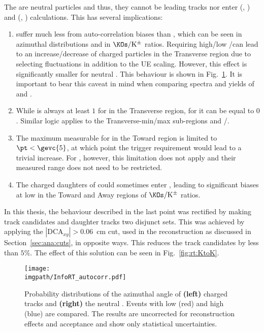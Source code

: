 The \VOs are neutral particles and thus, they cannot be leading tracks nor enter \NT (\NTmin, \NTmax) and \RT (\RTmin, \RTmax) calculations. This has several implications:
\begin{enumerate}
\item \VOs suffer much less from auto-correlation biases than \pikp, which can be seen in azimuthal distributions and in $\KOs / \mathrm{K}^\pm$ ratios. Requiring high/low \NT/\RT can lead to an increase/decrease of charged particles in the Transverse region due to selecting fluctuations in addition to the UE scaling. However, this effect is significantly smaller for neutral \VOs. This behaviour is shown in Fig.~\ref{fig:rt:autocorr}. It is important to bear this caveat in mind when comparing \pt spectra and yields of \pikp and \VOs.
\item While \NT is always at least $1$ for \pikp in the Transverse region, for \VOs it can be equal to $0$. Similar logic applies to the Transverse-min/max sub-regions and \NTmin/\NTmax .
\item The maximum \pt measurable for \pikp in the Toward region is limited to $\pt < \gevc{5}$, at which point the trigger requirement would lead to a trivial increase. For \VOs, however, this limitation does not apply and their measured \pt range does not need to be restricted.
\item The charged daughters of \VOs could sometimes enter \NT, leading to significant biases at low \pt in the Toward and Away regions of $\KOs/\mathrm{K}^\pm$ ratios. 
\end{enumerate} 

In this thesis, the behaviour described in the last point was rectified by making \NT track candidates and \VO daughter tracks two disjunct sets. This was achieved by applying the $|\mathrm{DCA}_{xy}|>0.06$~cm cut, used in the \VO reconstruction as discussed in Section~\ref{sec:ana:cuts}, in opposite ways. This reduces the \NT track candidates by less than $5\%$. The effect of this solution can be seen in Fig.~\ref{fig:rt:KtoK}.

\begin{figure}%
\texttt{[image: \\imgpath/InfoRT\_autocorr.pdf]}\\
\caption{Probability distributions of the azimuthal angle of \textbf{(left)} charged tracks and \textbf{(right)} the neutral \KOs. Events with low \NT (red) and high \NT (blue) are compared. The results are uncorrected for reconstruction  effects and acceptance and show only statistical uncertainties.}
\label{fig:rt:autocorr}
\end{figure}


